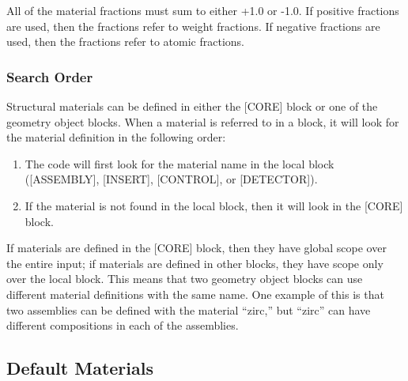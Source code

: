 All of the material fractions must sum to either +1.0 or -1.0.
If positive fractions are used, then the fractions refer to weight fractions.
If negative fractions are used, then the fractions refer to atomic fractions.

\subsubsection{Search Order}

Structural materials can be defined in either the [CORE] block or one of the
geometry object blocks. When a material is referred to in a block, it will look
for the material definition in the following order:
\begin{enumerate}  %
 \item The code will first look for the material name in the local block ([ASSEMBLY], [INSERT], [CONTROL], or [DETECTOR]).
 \item If the material is not found in the local block, then it will look in the [CORE] block.
\end{enumerate}

If materials are defined in the [CORE] block, then they have global scope over the entire input;
if materials are defined in other blocks, they have scope only over the local block. This means
that two geometry object blocks can use different material definitions with the same name.
One example of this is that two assemblies can be defined with the material ``zirc,'' but
``zirc'' can have different compositions in each of the assemblies.

\subsection{Default Materials}

